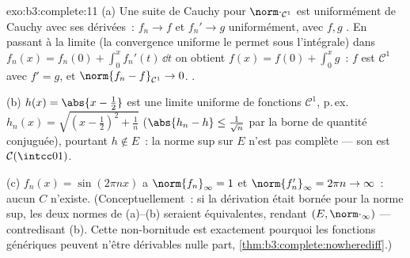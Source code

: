 \begin{solution}{exo:b3:complete:11}
(a) Une suite de Cauchy pour $\norm\cdot_{\mathcal C^1}$ est
uniformément de Cauchy avec ses dérivées~: $f_n \to f$ et
$f_n' \to g$ uniformément, avec $f, g$ . En passant
à la limite (la convergence uniforme le permet sous
l'intégrale) dans $f_n(x) = f_n(0) + \int_0^xf_n'(t)\,\dd t$
on obtient $f(x) = f(0) + \int_0^xg$~: $f$ est $\mathcal C^1$
avec $f' = g$, et $\norm{f_n - f}_{\mathcal C^1} \to 0$.
.

(b) $h(x) = \abs{x - \frac12}$ est une limite uniforme de
fonctions $\mathcal C^1$, p.\,ex.\ $h_n(x) = \sqrt{(x -
\frac12)^2 + \frac1n}$ ($\abs{h_n - h} \leq \frac1{\sqrt n}$
par la borne de quantité conjuguée), pourtant $h \notin E$~:
la norme sup sur $E$ n'est pas complète --- son  est
$\mathcal C(\intcc01)$.

(c) $f_n(x) = \sin(2\pi nx)$ a $\norm{f_n}_\infty = 1$ et
$\norm{f_n'}_\infty = 2\pi n \to \infty$~: aucun $C$
n'existe. (Conceptuellement~: si la dérivation était bornée
pour la norme sup, les deux normes de (a)--(b) seraient
équivalentes, rendant $(E, \norm\cdot_\infty)$  ---
contredisant (b). Cette non-bornitude est exactement pourquoi
les fonctions  génériques peuvent n'être dérivables
nulle part, \cref{thm:b3:complete:nowherediff}.)
\end{solution}

